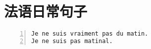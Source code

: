 \documentclass[11pt]{amsart}
\begin{document}
\section{法语日常句子}
\begin{lstlisting}[numbers=left,numberstyle=\tiny,numbersep=10pt]
Je ne suis vraiment pas du matin.
Je ne suis pas matinal.
\end{lstlisting}

 
   



 








\begin{thebibliography}{99}

 


  

\end{thebibliography}
\end{document}
